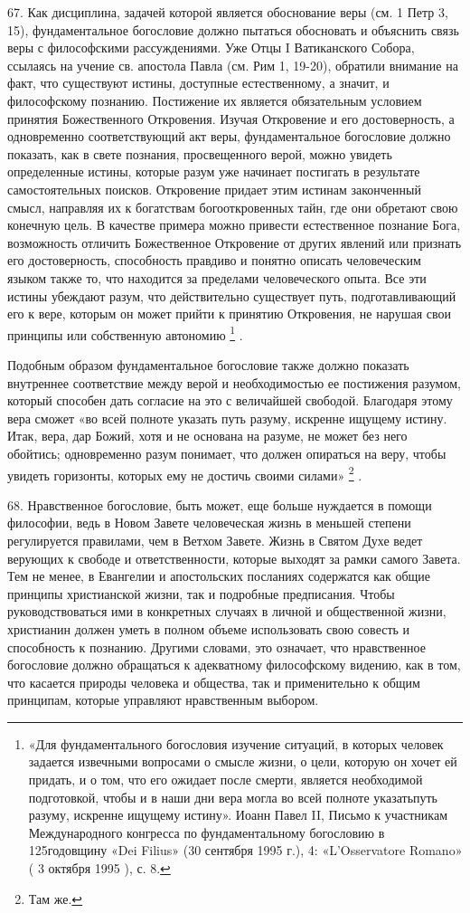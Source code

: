 \documentclass[a5paper,10pt]{article}
\begin{document}
67. Как дисциплина, задачей которой является обоснование веры (см. 1 Петр 3,
15), фундаментальное богословие должно пытаться обосновать и объяснить связь
веры с философскими рассуждениями. Уже Отцы I Ватиканского Собора, ссылаясь на
учение св. апостола Павла (см. Рим 1, 19-20), обратили внимание на факт, что
существуют истины, доступные естественному, а значит, и философскому познанию.
Постижение их является обязательным условием принятия Божественного Откровения.
Изучая Откровение и его достоверность, а одновременно соответствующий акт веры,
фундаментальное богословие должно показать, как в свете познания, просвещенного
верой, можно увидеть определенные истины, которые разум уже начинает постигать
в результате самостоятельных поисков. Откровение придает этим истинам
законченный смысл, направляя их к богатствам богооткровенных тайн, где они
обретают свою конечную цель. В качестве примера можно привести естественное
познание Бога, возможность отличить Божественное Откровение от других явлений
или признать его достоверность, способность правдиво и понятно описать
человеческим языком также то, что находится за пределами человеческого опыта.
Все эти истины убеждают разум, что действительно существует путь,
подготавливающий его к вере, которым он может прийти к принятию Откровения, не
нарушая свои принципы или собственную автономию \footnote{«Для фундаментального
    богословия изучение ситуаций, в которых человек задается извечными
    вопросами о смысле жизни, о цели, которую он хочет ей придать, и о том, что
    его ожидает после смерти, является необходимой подготовкой, чтобы и в наши
    дни вера могла во всей полноте указатьпуть разуму, искренне ищущему
    истину». Иоанн Павел II, Письмо к участникам Международного конгресса по
фундаментальному богословию в 125годовщину «Dei Filius» (30 сентября 1995 г.),
4: «L'Osservatore Romano» ( 3 октября 1995 ), с. 8.} .

Подобным образом фундаментальное богословие также должно показать внутреннее
соответствие между верой и необходимостью ее постижения разумом, который
способен дать согласие на это с величайшей свободой. Благодаря этому вера
сможет «во всей полноте указать путь разуму, искренне ищущему истину. Итак,
вера, дар Божий, хотя и не основана на разуме, не может без него обойтись;
одновременно разум понимает, что должен опираться на веру, чтобы увидеть
горизонты, которых ему не достичь своими силами» \footnote{Там же.} .

68. Нравственное богословие, быть может, еще больше нуждается в помощи
философии, ведь в Новом Завете человеческая жизнь в меньшей степени
регулируется правилами, чем в Ветхом Завете. Жизнь в Святом Духе ведет верующих
к свободе и ответственности, которые выходят за рамки самого Завета. Тем не
менее, в Евангелии и апостольских посланиях содержатся как общие принципы
христианской жизни, так и подробные предписания. Чтобы руководствоваться ими в
конкретных случаях в личной и общественной жизни, христианин должен уметь в
полном объеме использовать свою совесть и способность к познанию. Другими
словами, это означает, что нравственное богословие должно обращаться к
адекватному философскому видению, как в том, что касается природы человека и
общества, так и применительно к общим принципам, которые управляют нравственным
выбором.
\end{document}
